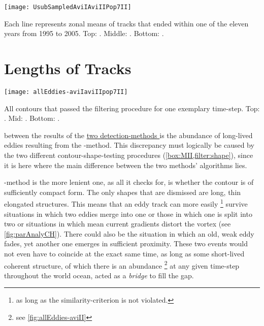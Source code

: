 \label{chap:discussion}



\begin{marginfigure}
	\label{fig:UsubSampledAviIAviIIPop7II}
	\texttt{[image: UsubSampledAviIAviIIPop7II]}
	\caption{Each line represents zonal means of tracks that ended within one of the eleven years from 1995 to 2005. Top: \aviI. Middle: \aviII. Bottom:  \popSevenII.}
\end{marginfigure}

\section{Lengths of Tracks}
\begin{marginfigure}
	\label{fig:allEddies-aviIaviIIpop7II}
	\texttt{[image: allEddies-aviIaviIIpop7II]}
	\caption{All contours that passed the filtering procedure for one exemplary time-step. Top: \aviI. Mid: \aviII. Bottom: \popSevenII.}
\end{marginfigure}
 between the results of the \href{box:MI}{two detection-methods } is the abundance of long-lived eddies resulting from the \MI-method.
This discrepancy must logically be caused by the two different contour-shape-testing procedures (\cref{box:MII,filter:shape}), since it is here where the main difference between the two methods' algorithms lies.

 \MI-method is the more lenient one, as all it checks for, is whether the contour is of sufficiently compact form. The only shapes that are dismissed are long, thin elongated structures. This means that \eg an eddy track can more easily \footnote{as long as the similarity-criterion is not violated.} survive situations in which two eddies merge into one or those in which one is split into two or situations in which mean current gradients distort the vortex (see \cref{fig:parAnalyCH}). There could also be the situation in which an old, weak eddy fades, yet another one emerges in sufficient proximity. These two events would not even have to coincide at the exact same time, as long as some short-lived coherent structure, of which there is an abundance \footnote{see \cref{fig:allEddies-aviII}} at any given time-step throughout the world ocean, acted as a \textit{bridge} to fill the gap.

